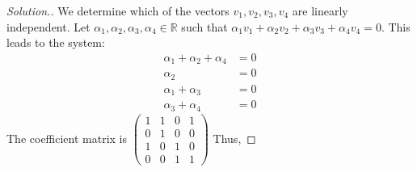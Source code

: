 \documentclass[11pt,a4paper]{article}
\theoremstyle{definition}
\newenvironment{solution}
  {\renewcommand{\qedsymbol}{}\begin{proof}[\textit{Solution}.]}
  {\end{proof}}
\begin{document}
\begin{solution}
We determine which of the vectors $v_1,v_2,v_3,v_4$ are linearly independent. Let $\alpha_1,\alpha_2, \alpha_3,\alpha_4\in \mathbb{R}$ such that $\alpha_1v_1+\alpha_2v_2+\alpha_3v_3+\alpha_4v_4=0$. This leads to the system:
\begin{align*}
\alpha_1+\alpha_2+\alpha_4 &=0\\
\alpha_2 &=0\\
\alpha_1+\alpha_3 &=0\\
\alpha_3+\alpha_4 &=0
\end{align*}
The coefficient matrix is
$
\begin{pmatrix}
1&1&0&1\\0&1&0&0\\1&0&1&0\\0&0&1&1
\end{pmatrix}
$
Thus,


\end{solution}
\end{document}
